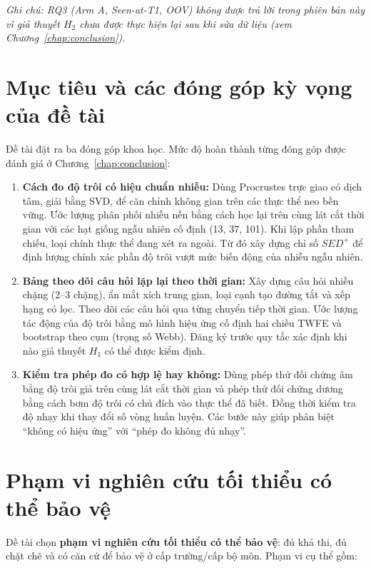 \noindent\textit{Ghi chú: RQ3 (Arm A, Seen-at-T1, OOV) không được trả lời trong phiên bản này vì giả thuyết $H_2$ chưa được thực hiện lại sau khi sửa dữ liệu (xem Chương~\ref{chap:conclusion}).}

\section{Mục tiêu và các đóng góp kỳ vọng của đề tài}
\label{sec:contributions}

Đề tài đặt ra ba đóng góp khoa học. Mức độ hoàn thành từng đóng góp được đánh giá ở Chương~\ref{chap:conclusion}:

\begin{enumerate}
    \item[\textbf{C1.}] \textbf{Cách đo độ trôi có hiệu chuẩn nhiễu:}
    Dùng Procrustes trực giao có dịch tâm, giải bằng SVD, để căn chỉnh không gian trên các thực thể neo bền vững. Ước lượng phân phối nhiễu nền bằng cách học lại trên cùng lát cắt thời gian với các hạt giống ngẫu nhiên cố định (13, 37, 101). Khi lập phần tham chiếu, loại chính thực thể đang xét ra ngoài. Từ đó xây dựng chỉ số $SED^+$ để định lượng chính xác phần độ trôi vượt mức biến động của nhiễu ngẫu nhiên.

    \item[\textbf{C2.}] \textbf{Bảng theo dõi câu hỏi lặp lại theo thời gian:}
    Xây dựng câu hỏi nhiều chặng (2--3 chặng), ẩn mắt xích trung gian, loại cạnh tạo đường tắt và xếp hạng có lọc. Theo dõi các câu hỏi qua từng chuyển tiếp thời gian. Ước lượng tác động của độ trôi bằng mô hình hiệu ứng cố định hai chiều TWFE và bootstrap theo cụm (trọng số Webb). Đăng ký trước quy tắc xác định khi nào giả thuyết $H_1$ có thể được kiểm định.

    \item[\textbf{C3.}] \textbf{Kiểm tra phép đo có hợp lệ hay không:}
    Dùng phép thử đối chứng âm bằng độ trôi giả trên cùng lát cắt thời gian và phép thử đối chứng dương bằng cách bơm độ trôi có chủ đích vào thực thể đã biết. Đồng thời kiểm tra độ nhạy khi thay đổi số vòng huấn luyện. Các bước này giúp phân biệt “không có hiệu ứng” với “phép đo không đủ nhạy”.
\end{enumerate}

\section{Phạm vi nghiên cứu tối thiểu có thể bảo vệ}
\label{sec:mvr_scope}

Đề tài chọn \textbf{phạm vi nghiên cứu tối thiểu có thể bảo vệ}: đủ khả thi, đủ chặt chẽ và có căn cứ để bảo vệ ở cấp trường/cấp bộ môn. Phạm vi cụ thể gồm:

